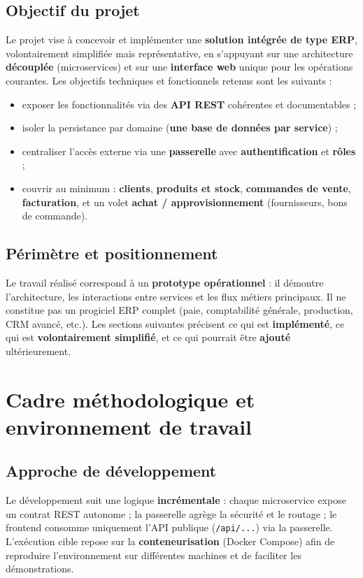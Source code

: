 \documentclass[11pt,a4paper]{article}
\begin{document}
\subsection{Objectif du projet}
Le projet vise à concevoir et implémenter une \textbf{solution intégrée de type ERP}, volontairement simplifiée mais représentative, en s'appuyant sur une architecture \textbf{découplée} (microservices) et sur une \textbf{interface web} unique pour les opérations courantes. Les objectifs techniques et fonctionnels retenus sont les suivants :
\begin{itemize}[noitemsep]
  \item exposer les fonctionnalités via des \textbf{API REST} cohérentes et documentables ;
  \item isoler la persistance par domaine (\textbf{une base de données par service}) ;
  \item centraliser l'accès externe via une \textbf{passerelle} avec \textbf{authentification} et \textbf{rôles} ;
  \item couvrir au minimum : \textbf{clients}, \textbf{produits et stock}, \textbf{commandes de vente}, \textbf{facturation}, et un volet \textbf{achat / approvisionnement} (fournisseurs, bons de commande).
\end{itemize}

\subsection{Périmètre et positionnement}
Le travail réalisé correspond à un \textbf{prototype opérationnel} : il démontre l'architecture, les interactions entre services et les flux métiers principaux. Il ne constitue pas un progiciel ERP complet (paie, comptabilité générale, production, CRM avancé, etc.). Les sections suivantes précisent ce qui est \textbf{implémenté}, ce qui est \textbf{volontairement simplifié}, et ce qui pourrait être \textbf{ajouté} ultérieurement.

\section{Cadre méthodologique et environnement de travail}

\subsection{Approche de développement}
Le développement suit une logique \textbf{incrémentale} : chaque microservice expose un contrat REST autonome ; la passerelle agrège la sécurité et le routage ; le frontend consomme uniquement l'API publique (\texttt{/api/...}) via la passerelle. L'exécution cible repose sur la \textbf{conteneurisation} (Docker Compose) afin de reproduire l'environnement sur différentes machines et de faciliter les démonstrations.
\end{document}
